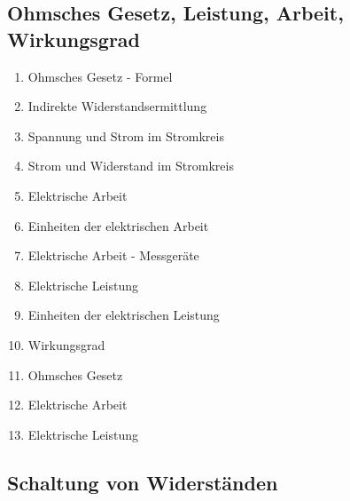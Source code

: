 \subsection{Ohmsches Gesetz, Leistung, Arbeit,
Wirkungsgrad}\label{ohmsches-gesetz-leistung-arbeit-wirkungsgrad}

\begin{enumerate}
\item
  Ohmsches Gesetz - Formel\\
\item
  Indirekte Widerstandsermittlung\\
\item
  Spannung und Strom im Stromkreis\\
\item
  Strom und Widerstand im Stromkreis\\
\item
  Elektrische Arbeit\\
\item
  Einheiten der elektrischen Arbeit\\
\item
  Elektrische Arbeit - Messgeräte\\
\item
  Elektrische Leistung\\
\item
  Einheiten der elektrischen Leistung\\
\item
  Wirkungsgrad\\
\item
  Ohmsches Gesetz\\
\item
  Elektrische Arbeit\\
\item
  Elektrische Leistung
\end{enumerate}

\subsection{Schaltung von
Widerständen}\label{schaltung-von-widerstaenden}

